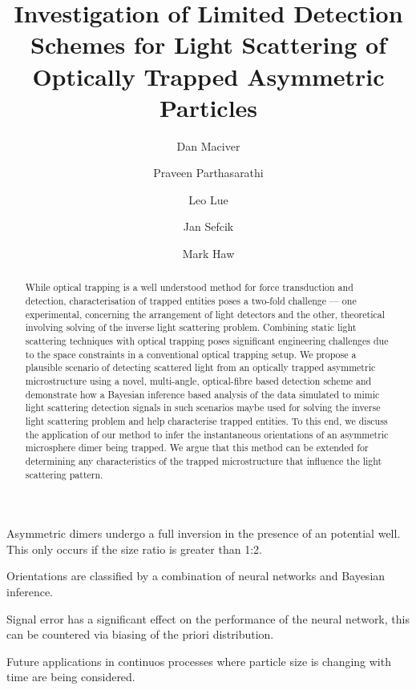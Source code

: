 \documentclass[final,  3p]{elsarticle}
\begin{document}
\begin{frontmatter}

\title{Investigation of Limited Detection Schemes for Light Scattering of Optically Trapped Asymmetric Particles}


\author[aff1]{Dan Maciver} 

\author[aff1]{Praveen Parthasarathi}

\author[aff1]{Leo Lue}

\author[aff1]{Jan Sefcik}

\author[aff1]{Mark Haw}






\begin{abstract}
  While optical trapping is a well understood method for force
  transduction and detection, characterisation of trapped entities
  poses a two-fold challenge --- one experimental, concerning the
  arrangement of light detectors and the other, theoretical involving
  solving of the inverse light scattering problem. Combining static
  light scattering techniques with optical trapping poses significant
  engineering challenges due to the space constraints in a
  conventional optical trapping setup.  We propose a plausible
  scenario of detecting scattered light from an optically trapped
  asymmetric microstructure using a novel, multi-angle, optical-fibre
  based detection scheme and demonstrate how a Bayesian inference
  based analysis of the data simulated to mimic light scattering
  detection signals in such scenarios maybe used for solving the
  inverse light scattering problem and help characterise trapped
  entities.  To this end, we discuss the application of our method to
  infer the instantaneous orientations of an asymmetric microsphere
  dimer being trapped. We argue that this method can be extended for
  determining any characteristics of the trapped microstructure that
  influence the light scattering pattern.
\end{abstract}

\begin{highlights}
\item Asymmetric dimers undergo a full inversion in the presence of an potential well. This only occurs if the size ratio is greater than 1:2.  
\item Orientations are classified by a combination of neural networks and Bayesian inference. 
\item Signal error has a significant effect on the performance of the neural network, this can be countered via biasing of the priori distribution. 
\item Future applications in continuos processes where particle size is changing with time are being considered.  
\end{highlights}


\end{frontmatter}
\end{document}
